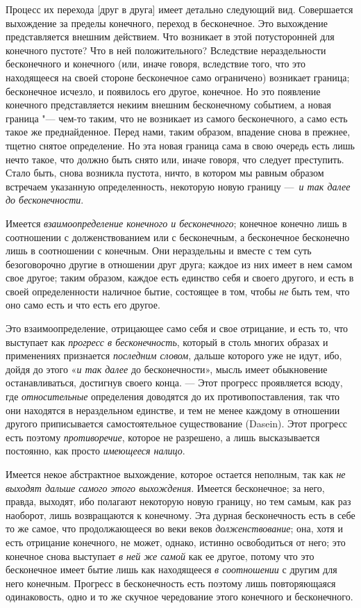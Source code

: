 Процесс их перехода [друг в друга] имеет детально следующий вид. Совершается
выхождение за пределы конечного, переход в бесконечное. Это выхождение
представляется внешним действием. Что возникает в этой потусторонней для
конечного пустоте? Что в ней положительного? Вследствие нераздельности
бесконечного и конечного (или, иначе говоря, вследствие того, что это
находящееся на своей стороне бесконечное само ограничено) возникает
граница; бесконечное исчезло, и появилось его другое, конечное. Но это
появление конечного представляется некиим внешним бесконечному событием, а
новая граница "--- чем-то таким, что не возникает из самого бесконечного, а
само есть такое же преднайденное. Перед нами, таким образом, впадение снова
в прежнее, тщетно снятое определение. Но эта новая граница сама в свою
очередь есть лишь нечто такое, что должно быть снято или, иначе говоря, что
следует преступить. Стало быть, снова возникла пустота, ничто, в котором мы
равным образом встречаем указанную определенность, некоторую новую границу
—~{\em и так далее до бесконечности}.

Имеется {\em взаимоопределение конечного и
бесконечного}; конечное конечно лишь в соотношении с долженствованием или с
бесконечным, а бесконечное бесконечно лишь в соотношении с конечным. Они
нераздельны и вместе с тем суть безоговорочно другие в отношении друг
друга; каждое из них имеет в нем самом свое другое; таким образом, каждое
есть единство себя и своего другого, и есть в своей определенности наличное
бытие, состоящее в том, чтобы {\em не} быть тем, что
оно само есть и что есть его другое.

Это взаимоопределение, отрицающее само себя и свое отрицание, и есть то, что
выступает как {\em прогресс в бесконечность}, который в
столь многих образах и применениях признается
{\em последним словом}, дальше которого уже не идут,
ибо, дойдя до этого «{\em и так далее} до
бесконечности», мысль имеет обыкновение останавливаться, достигнув своего
конца. — Этот прогресс проявляется всюду, где
{\em относительные} определения доводятся до их
противопоставления, так что они находятся в нераздельном единстве, и тем не
менее каждому в отношении другого приписывается самостоятельное
существование (Dasein). Этот прогресс есть поэтому
{\em противоречие}, которое не разрешено, а лишь
высказывается постоянно, как просто {\em имеющееся
налицо}.

Имеется некое абстрактное выхождение, которое остается неполным, так как
{\em не выходят дальше самого этого выхождения}.
Имеется бесконечное; за него, правда, выходят, ибо полагают некоторую новую
границу, но тем самым, как раз наоборот, лишь возвращаются к конечному. Эта
дурная бесконечность есть в себе то же самое, что продолжающееся во веки
веков {\em долженствование}; она, хотя и есть отрицание
конечного, не может, однако, истинно освободиться от него; это конечное
снова выступает {\em в ней же самой} как ее другое,
потому что это бесконечное имеет бытие лишь как находящееся
{\em в соотношении} с другим для него конечным.
Прогресс в бесконечность есть поэтому лишь повторяющаяся одинаковость, одно
и то же скучное чередование этого конечного и бесконечного.


